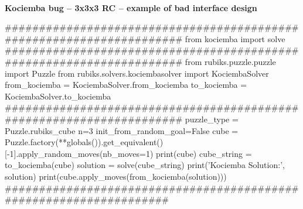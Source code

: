 \paragraph{}{\textbf{Kociemba bug -- 3x3x3 \textbf{RC} -- example of \textbf{bad} interface design}}
\begin{python}
#####################################################################
from kociemba import solve
#####################################################################
from rubiks.puzzle.puzzle import Puzzle
from rubiks.solvers.kociembasolver import KociembaSolver
from_kociemba = KociembaSolver.from_kociemba
to_kociemba = KociembaSolver.to_kociemba
#####################################################################
puzzle_type = Puzzle.rubiks_cube
n=3
init_from_random_goal=False
cube = Puzzle.factory(**globals()).get_equivalent()[-1].apply_random_moves(nb_moves=1)
print(cube)
cube_string = to_kociemba(cube)
solution = solve(cube_string)
print('Kociemba Solution:', solution)
print(cube.apply_moves(from_kociemba(solution)))
###################################################################
\end{python}
\black

